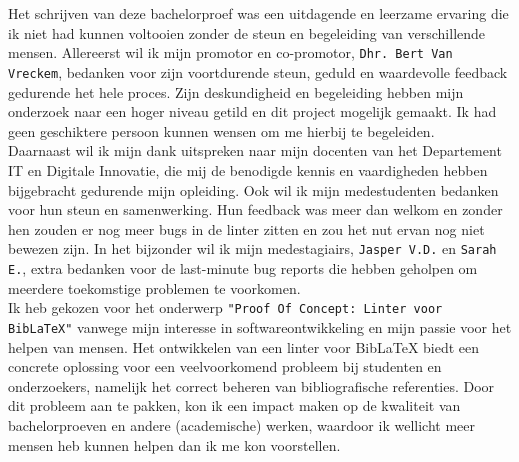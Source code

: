 
\chapter*{}%
\label{ch:voorwoord}


Het schrijven van deze bachelorproef was een uitdagende en leerzame ervaring die ik niet had kunnen voltooien zonder de steun en begeleiding van verschillende mensen. Allereerst wil ik mijn promotor en co-promotor, \texttt{Dhr. Bert Van Vreckem}, bedanken voor zijn voortdurende steun, geduld en waardevolle feedback gedurende het hele proces. Zijn deskundigheid en begeleiding hebben mijn onderzoek naar een hoger niveau getild en dit project mogelijk gemaakt. Ik had geen geschiktere persoon kunnen wensen om me hierbij te begeleiden.
\\ \newline{}
Daarnaast wil ik mijn dank uitspreken naar mijn docenten van het Departement IT en Digitale Innovatie, die mij de benodigde kennis en vaardigheden hebben bijgebracht gedurende mijn opleiding. Ook wil ik mijn medestudenten bedanken voor hun steun en samenwerking. Hun feedback was meer dan welkom en zonder hen zouden er nog meer bugs in de linter zitten en zou het nut ervan nog niet bewezen zijn. In het bijzonder wil ik mijn medestagiairs, \texttt{Jasper V.D.} en \texttt{Sarah E.}, extra bedanken voor de last-minute bug reports die hebben geholpen om meerdere toekomstige problemen te voorkomen.
\\ \newline{}
Ik heb gekozen voor het onderwerp \texttt{"Proof Of Concept: Linter voor BibLaTeX"} vanwege mijn interesse in softwareontwikkeling en mijn passie voor het helpen van mensen. Het ontwikkelen van een linter voor BibLaTeX biedt een concrete oplossing voor een veelvoorkomend probleem bij studenten en onderzoekers, namelijk het correct beheren van bibliografische referenties. Door dit probleem aan te pakken, kon ik een impact maken op de kwaliteit van bachelorproeven en andere (academische) werken, waardoor ik wellicht meer mensen heb kunnen helpen dan ik me kon voorstellen.
